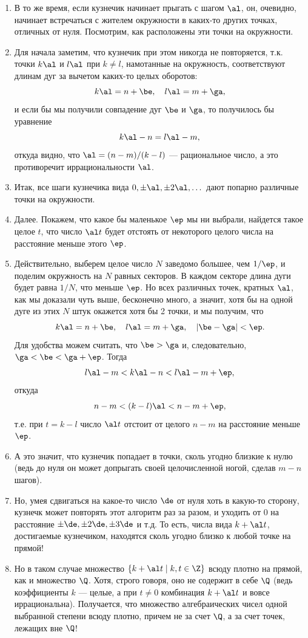 \begin{enumerate}
\item В то же время, если кузнечик начинает прыгать с шагом $\al$, он, очевидно, начинает встречаться с жителем окружности в каких-то других точках, отличных от нуля. Посмотрим, как расположены эти точки на окружности.
\item Для начала заметим, что кузнечик при этом никогда не повторяется, т.к. точки $k\al$ и $l\al$ при $k\ne l$, намотанные на окружность, соответствуют длинам дуг за вычетом каких-то целых оборотов:
$$
k\al = n + \be,\quad l\al=m+\ga,
$$
и если бы мы получили совпадение дуг $\be$ и $\ga$, то получилось бы уравнение
$$
k\al-n=l\al-m,
$$
откуда видно, что $\al=(n-m)/(k-l)$ --- рациональное число, а это противоречит иррациональности $\al$.
\item Итак, все шаги кузнечика вида $0,\pm\al,\pm 2\al,\dots$ дают попарно различные точки на окружности.
\item Далее. Покажем, что какое бы маленькое $\ep$ мы ни выбрали, найдется такое целое $t$, что число $\al t$ будет отстоять от некоторого целого числа на расстояние меньше этого $\ep$.
\item Действительно, выберем целое число $N$ заведомо большее, чем $1/\ep$, и поделим окружность на $N$ равных секторов. В каждом секторе длина дуги будет равна $1/N$, что меньше $\ep$. Но всех различных точек, кратных $\al$, как мы доказали чуть выше, бесконечно много, а значит, хотя бы на одной дуге из этих $N$ штук окажется хотя бы 2 точки, и мы получим, что
$$
k\al = n + \be,\quad l\al=m+\ga,\quad|\be-\ga|<\ep.
$$
Для удобства можем считать, что $\be>\ga$ и, следовательно, $\ga<\be<\ga+\ep$. Тогда
$$
l\al-m<k\al-n<l\al-m+\ep,
$$
откуда 
$$
n-m<(k-l)\al < n-m+\ep,
$$
т.е. при $t=k-l$ число $\al t$ отстоит от целого $n-m$ на расстояние меньше $\ep$.
\item А это значит, что кузнечик попадает в точки, сколь угодно близкие к нулю (ведь до нуля он может допрыгать своей целочисленной ногой, сделав $m-n$ шагов).
\item Но, умея сдвигаться на какое-то число $\de$ от нуля хоть в какую-то сторону, кузнечк может повторять этот алгоритм раз за разом, и уходить от 0 на расстояние $\pm\de,\pm 2\de,\pm 3\de$ и т.д.  То есть, числа вида $k+\al t$, достигаемые кузнечиком, находятся сколь угодно близко к любой точке на прямой!
\item Но в таком случае множество $\{k+\al t\mid k,t\in\Z\}$ всюду плотно на прямой, как и множество $\Q$. Хотя, строго говоря, оно не содержит в себе $\Q$ (ведь коэффициенты $k$ --- целые, а при $t\ne 0$ комбинация $k+\al t$ и вовсе иррациональна). Получается, что множество алгебраических чисел одной выбранной степени всюду плотно, причем не за счет $\Q$, а за счет точек, лежащих вне $\Q$!

\end{enumerate}
